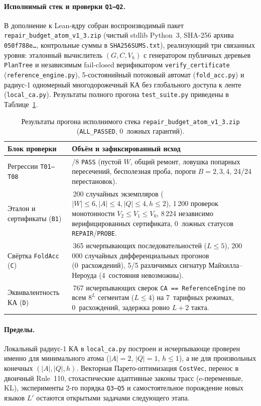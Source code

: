 \documentclass[11pt,a4paper]{article}
\theoremstyle{preprintthm}
\theoremstyle{preprintdef}
\begin{document}
\paragraph{Исполнимый стек и проверки \texttt{Q1--Q2}.}
В дополнение к Lean-ядру собран воспроизводимый пакет \texttt{repair\_budget\_atom\_v1\_3.zip} (чистый stdlib Python~3, SHA-256 архива \texttt{050f788e\ldots}, контрольные суммы в \texttt{SHA256SUMS.txt}), реализующий три связанных уровня: эталонный вычислитель $(G,C,V_h)$ с генератором публичных деревьев \texttt{PlanTree} и независимым fail-closed верификатором \texttt{verify\_certificate} (\texttt{reference\_engine.py}), 5-состоянийный потоковый автомат (\texttt{fold\_acc.py}) и радиус-1 одномерный многодорожечный КА без глобального доступа к ленте (\texttt{local\_ca.py}). Результаты полного прогона \texttt{test\_suite.py} приведены в Таблице~\ref{tab:exec}.

\begin{table}[!htbp]
\centering
\caption{Результаты прогона исполнимого стека \texttt{repair\_budget\_atom\_v1\_3.zip} (\texttt{ALL\_PASSED}, 0~ложных гарантий).}
\label{tab:exec}
\footnotesize
\begin{tabularx}{\linewidth}{@{}l >{\raggedright\arraybackslash}X@{}}
\toprule
\textbf{Блок проверки} & \textbf{Объём и зафиксированный исход} \\
\midrule
Регрессии \texttt{T01--T08} & 8/8 \texttt{PASS} (пустой $W$, общий ремонт, ловушка попарных пересечений, бесполезная проба, пороги $B=2,3,4$, 24/24 перестановок). \\
Эталон и сертификаты (\texttt{B1}) & 1\,200 случайных экземпляров ($|W|\le 6,|A|\le 4,|Q|\le 4,h\le 2$), 1\,200 проверок монотонности $V_2\le V_1\le V_0$, 8\,224 независимо верифицированных сертификата, 0~ложных статусов \texttt{REPAIR}/\texttt{PROBE}. \\
Свёртка \texttt{FoldAcc} (\texttt{C}) & 1\,365 исчерпывающих последовательностей ($L\le 5$), 200\,000 случайных дифференциальных прогонов (0~расхождений), 5/5 различимых сигнатур Майхилла--Нероуда (4~состояния невозможны). \\
Эквивалентность КА (\texttt{D}) & 32\,767 исчерпывающих сверок \texttt{CA == ReferenceEngine} по всем $8^L$ сегментам ($L\le 4$) на 7~тарифных режимах, 0~расхождений, задержка ровно $L+2$ такта. \\
\bottomrule
\end{tabularx}
\end{table}

\paragraph{Пределы.}
Локальный радиус-1 КА в \texttt{local\_ca.py} построен и исчерпывающе проверен именно для минимального атома ($|A|=2$, $|Q|=1$, $h\le 1$), а не для произвольных конечных $(|A|,|Q|,h)$. Векторная Парето-оптимизация \texttt{CostVec}, перенос в двоичный Rule~110, стохастические адаптивные законы трасс (e-переменные, KL), эксперименты 2-го порядка \texttt{Q3--Q5} и самостоятельное порождение новых языков $L'$ остаются открытыми задачами следующего этапа.
\end{document}

